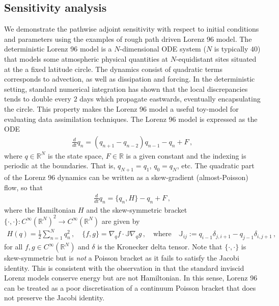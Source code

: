 \documentclass[11pt, oneside]{article}
\numberwithin{equation}{section}
\theoremstyle{definition}
\begin{document}
\subsection{Sensitivity analysis}\label{subsec:gradient comp}
We demonstrate the pathwise adjoint sensitivity with respect to initial conditions and parameters using the examples of rough path driven Lorenz 96 model. The deterministic Lorenz 96 model \cite{LE1998} is a $N$-dimensional ODE system ($N$ is typically $40$) that models some atmospheric physical quantities at $N$-equidistant sites situated at the a fixed latitude circle. The dynamics consist of quadratic terms corresponds to advection, as well as dissipation and forcing. In the deterministic setting, standard numerical integration has shown that the local discrepancies tends to double every $2$ days which propagate eastwards, eventually encapsulating the circle. This property makes the Lorenz 96 model a useful toy-model for evaluating data assimilation techniques. The Lorenz 96 model is expressed as the ODE
\begin{align}
    \frac{d}{dt}q_n = (q_{n+1} - q_{n-2})q_{n-1} - q_{n} + F\,, \label{eq:det Lorenz 96}
\end{align}
where $q \in \mathbb{R}^N$ is the state space, $F \in \mathbb{R}$ is a given constant and the indexing is periodic at the boundaries. That is, $q_{N+1} = q_{1}$, $q_{0} = q_{N}$, etc. The quadratic part of the Lorenz 96 dynamics can be written as a skew-gradient (almost-Poisson) flow, so that
\begin{align*}
    \frac{d}{dt}q_n = \{q_n, H\}- q_{n} + F \,, 
\end{align*}
where the Hamiltonian $H$ and the skew-symmetric bracket $\{\cdot,\cdot\}: C^\infty(\mathbb{R}^N)^2 \rightarrow C^\infty(\mathbb{R}^N)$ are given by
\begin{align*}
    H(q) = \frac{1}{2}\sum_{n=1}^N q_n^2\,, \quad \{f,g\} = \nabla_q f \cdot \mathbb{J} \nabla_q g\,,\quad \text{where} \quad \mathbb{J}_{ij} := q_{i-1}\delta_{j, i+1} - q_{j-1}\delta_{i, j+1}\,,
\end{align*}
for all $f, g \in C^\infty(\mathbb{R}^N)$ and $\delta$ is the Kronecker delta tensor. Note that $\{\cdot,\cdot\}$ is skew-symmetric but is \emph{not} a Poisson bracket as it fails to satisfy the Jacobi identity. This is consistent with the observation in \cite{FCHZ2025} that the standard inviscid Lorenz models conserve energy but are not Hamiltonian. In this sense, Lorenz 96 can be treated as a poor discretisation of a continuum Poisson bracket that does not preserve the Jacobi identity. 
\end{document}
